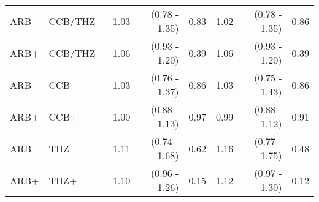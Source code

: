 \documentclass[11pt,]{article}
\begin{document}
\begin{table}[H]
{\begin{tabular}{llrrrrrr}
  ARB & CCB/THZ & 1.03 & (0.78 - 1.35) & 0.83 & 1.02 & (0.78 - 1.35) & 0.86 \\ 
  ARB+ & CCB/THZ+ & 1.06 & (0.93 - 1.20) & 0.39 & 1.06 & (0.93 - 1.20) & 0.39 \\ 
  ARB & CCB & 1.03 & (0.76 - 1.37) & 0.86 & 1.03 & (0.75 - 1.43) & 0.86 \\ 
  ARB+ & CCB+ & 1.00 & (0.88 - 1.13) & 0.97 & 0.99 & (0.88 - 1.12) & 0.91 \\ 
  ARB & THZ & 1.11 & (0.74 - 1.68) & 0.62 & 1.16 & (0.77 - 1.75) & 0.48 \\ 
  ARB+ & THZ+ & 1.10 & (0.96 - 1.26) & 0.15 & 1.12 & (0.97 - 1.30) & 0.12 \\ 
    \bottomrule
  \end{tabular}
  }
\end{table}
\begin{table}[H]
 \caption{Risk estimates for PAAS across propensity score stratifed, prevalent-user cohorts in the VA-OMOP data source. We report uncalibrated and calibrated hazard ratios (HRs) and their 95\% confidence intervals (CIs). (+) indicates in-combination cohorts.}
\end{table}
\end{document}

